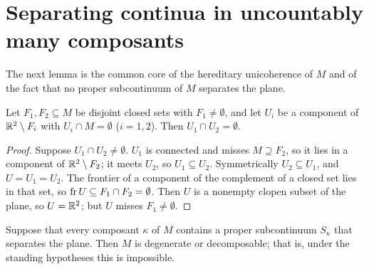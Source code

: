 \section{Separating continua in uncountably many composants}

The next lemma is the common core of the hereditary unicoherence of $M$ and of the fact that no
proper subcontinuum of $M$ separates the plane.

\begin{lemma}\label{lem:disjoint-domains}
Let $F_1,F_2\subseteq M$ be disjoint closed sets with $F_1\ne\emptyset$, and let $U_i$ be a component of
$\mathbb{R}^2\setminus F_i$ with $U_i\cap M=\emptyset$ ($i=1,2$). Then $U_1\cap U_2=\emptyset$.
\end{lemma}

\begin{proof}
Suppose $U_1\cap U_2\neq\emptyset$. $U_1$ is connected and misses $M\supseteq F_2$, so it lies in a component of
$\mathbb{R}^2\setminus F_2$; it meets $U_2$, so $U_1\subseteq U_2$. Symmetrically $U_2\subseteq U_1$, and $U=U_1=U_2$. The
frontier of a component of the complement of a closed set lies in that set, so $\operatorname{fr} U\subseteq F_1\cap
F_2=\emptyset$. Then $U$ is a nonempty clopen subset of the plane, so $U=\mathbb{R}^2$; but $U$ misses
$F_1\neq\emptyset$.
\end{proof}


\begin{lemma}\label{lem:sep-composants}
Suppose that every composant $\kappa$ of $M$ contains a proper subcontinuum $S_\kappa$ that separates the
plane. Then $M$ is degenerate or decomposable; that is, under the standing hypotheses this is
impossible.
\end{lemma}

